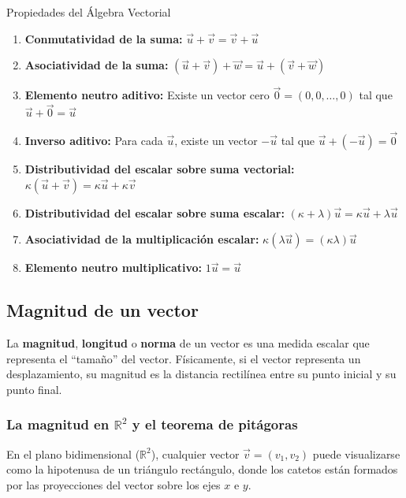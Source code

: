 \begin{mytheorem}{Propiedades del Álgebra Vectorial}
\begin{enumerate}
    \item \textbf{Conmutatividad de la suma:} $\vec{u} + \vec{v} = \vec{v} + \vec{u}$
    \item \textbf{Asociatividad de la suma:} $(\vec{u} + \vec{v}) + \vec{w} = \vec{u} + (\vec{v} + \vec{w})$
    \item \textbf{Elemento neutro aditivo:} Existe un vector cero $\vec{0} = (0,0,\dots,0)$ tal que $\vec{u} + \vec{0} = \vec{u}$
    \item \textbf{Inverso aditivo:} Para cada $\vec{u}$, existe un vector $-\vec{u}$ tal que $\vec{u} + (-\vec{u}) = \vec{0}$
    \item \textbf{Distributividad del escalar sobre suma vectorial:} $\kappa(\vec{u} + \vec{v}) = \kappa\vec{u} + \kappa\vec{v}$
    \item \textbf{Distributividad del escalar sobre suma escalar:} $(\kappa + \lambda)\vec{u} = \kappa\vec{u} + \lambda\vec{u}$
    \item \textbf{Asociatividad de la multiplicación escalar:} $\kappa(\lambda\vec{u}) = (\kappa\lambda)\vec{u}$
    \item \textbf{Elemento neutro multiplicativo:} $1\vec{u} = \vec{u}$
\end{enumerate}
\end{mytheorem}

\subsection{Magnitud de un vector}

La \textbf{magnitud}, \textbf{longitud} o \textbf{norma} de un vector es una medida escalar que representa el ``tamaño'' del vector. Físicamente, si el vector representa un desplazamiento, su magnitud es la distancia rectilínea entre su punto inicial y su punto final.

\subsubsection{La magnitud en $\mathbb{R}^2$ y el teorema de pitágoras}

En el plano bidimensional ($\mathbb{R}^2$), cualquier vector $\vec{v} = (v_1, v_2)$ puede visualizarse como la hipotenusa de un triángulo rectángulo, donde los catetos están formados por las proyecciones del vector sobre los ejes $x$ e $y$.

